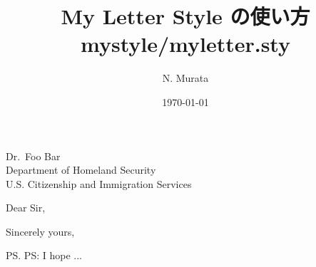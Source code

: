 \documentclass[12pt]{scrartcl}
\author{N. Murata}
\date{\today}
\title{My Letter Style の使い方\\\medskip
\large mystyle/myletter.sty}
\begin{document}

\begin{letter}{ %
    Dr.~Foo Bar\\
    Department of Homeland Security\\
    U.S. Citizenship and Immigration Services\\
}

\opening{Dear Sir,}

\lipsum

\closing{Sincerely yours,}
\ps PS: I hope ...
\end{letter}
\end{document}
